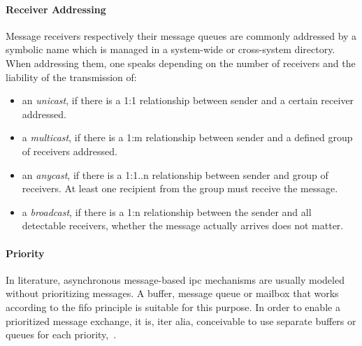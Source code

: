 \paragraph{Receiver Addressing}
Message receivers respectively their message queues are commonly addressed by a symbolic name which is managed in a system-wide or cross-system directory.
When addressing them, one speaks depending on the number of receivers and the liability of the transmission of:
\begin{itemize}
    \item an \textit{unicast}, if there is a 1:1 relationship between sender and a certain receiver addressed.
    \item a \textit{multicast}, if there is a 1:m relationship between sender and a defined group of receivers addressed.
    \item an \textit{anycast}, if there is a 1:1..n relationship between sender and group of receivers. At least one recipient from the group must receive the message.
    \item a \textit{broadcast}, if there is a 1:n relationship between the sender and all detectable receivers, whether the message actually arrives does not matter\cite{glatz2015betriebssysteme}.
\end{itemize}

\paragraph{Priority}
In literature, asynchronous message-based \ac{ipc} mechanisms are usually modeled without prioritizing messages.
A buffer, message queue or mailbox that works according to the \ac{fifo} principle is suitable for this purpose.
In order to enable a prioritized message exchange, it is, iter alia, conceivable to use separate buffers or queues for each priority\cite{glatz2015betriebssysteme},~\cite{tanenbaum-modern-operating-systems}.


